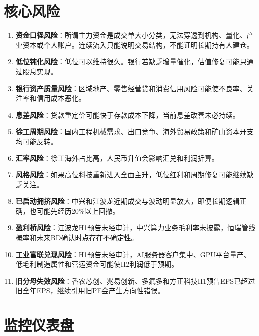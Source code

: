 \section{核心风险}

\begin{enumerate}
  \item \textbf{资金口径风险}：所谓主力资金是成交单大小分类，无法穿透到机构、量化、产业资本或个人账户。连续流入只能说明交易结构，不能证明长期持有人建仓。
  \item \textbf{低位钝化风险}：低位可以维持很久。银行若缺乏增量催化，估值修复可能只通过股息实现。
  \item \textbf{银行资产质量风险}：区域地产、零售经营贷和消费信用风险可能使不良率、关注率和信用成本恶化。
  \item \textbf{息差风险}：贷款重定价可能快于存款成本下降，当前息差改善未必持续。
  \item \textbf{徐工周期风险}：国内工程机械需求、出口竞争、海外贸易政策和矿山资本开支均可能反转。
  \item \textbf{汇率风险}：徐工海外占比高，人民币升值会影响汇兑和利润折算。
  \item \textbf{风格风险}：如果高位科技重新进入全面主升，低位红利和周期修复可能继续缺乏关注。
  \item \textbf{已启动拥挤风险}：中兴和江波龙近期成交与波动明显放大，即便长期逻辑正确，也可能先经历20\%以上回撤。
  \item \textbf{盈利桥风险}：江波龙H1预告未经审计，中兴算力业务毛利率未披露，恒瑞管线概率和未来BD确认时点存在不确定性。
  \item \textbf{工业富联兑现风险}：H1预告未经审计，AI服务器客户集中、GPU平台量产、低毛利制造属性和营运资金可能使H2利润低于预期。
  \item \textbf{旧分母失效风险}：香农芯创、兆易创新、多氟多和方正科技H1预告EPS已超过旧全年EPS，继续引用旧PE会产生方向性错误。
\end{enumerate}

\section{监控仪表盘}

